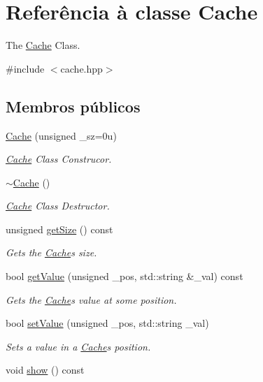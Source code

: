 \hypertarget{classCache}{}\section{Referência à classe Cache}
\label{classCache}


The \hyperlink{classCache}{Cache} Class.  




{\ttfamily \#include $<$cache.\+hpp$>$}

\subsection*{Membros públicos}
\begin{DoxyCompactItemize}
\item 
\hyperlink{classCache_ab2fd62d030c2310489e64ed6a640c1a4}{Cache} (unsigned \+\_\+sz=0u)
\begin{DoxyCompactList}\small\item\em \hyperlink{classCache}{Cache} Class Construcor. \end{DoxyCompactList}\item 
\hyperlink{classCache_af8b171a6c49d88d3ba179477484b9d48}{$\sim$\+Cache} ()\hypertarget{classCache_af8b171a6c49d88d3ba179477484b9d48}{}\label{classCache_af8b171a6c49d88d3ba179477484b9d48}

\begin{DoxyCompactList}\small\item\em \hyperlink{classCache}{Cache} Class Destructor. \end{DoxyCompactList}\item 
unsigned \hyperlink{classCache_aeba1d1861c728efecdf8774de51c77d0}{get\+Size} () const 
\begin{DoxyCompactList}\small\item\em Gets the \hyperlink{classCache}{Cache}\textquotesingle{}s size. \end{DoxyCompactList}\item 
bool \hyperlink{classCache_a6cae76d581d7c6c655652ed8c7a5afca}{get\+Value} (unsigned \+\_\+pos, std\+::string \&\+\_\+val) const 
\begin{DoxyCompactList}\small\item\em Gets the \hyperlink{classCache}{Cache}\textquotesingle{}s value at some position. \end{DoxyCompactList}\item 
bool \hyperlink{classCache_a02204c5cca523c17e51821f4a28f13cd}{set\+Value} (unsigned \+\_\+pos, std\+::string \+\_\+val)
\begin{DoxyCompactList}\small\item\em Sets a value in a \hyperlink{classCache}{Cache}\textquotesingle{}s position. \end{DoxyCompactList}\item 
void \hyperlink{classCache_adfb26258521f5063f045ff16e63555b8}{show} () const \hypertarget{classCache_adfb26258521f5063f045ff16e63555b8}{}\label{classCache_adfb26258521f5063f045ff16e63555b8}


\end{DoxyCompactItemize}
